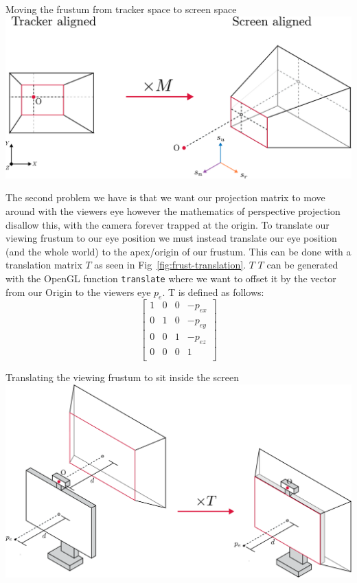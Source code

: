 \begin{figureBox}[label={fig:basis-change}]{Moving the frustum from tracker space to screen space}
    \includegraphics[width = 0.8\linewidth]{./background/figures/projection/realignment.pdf}
\end{figureBox}

The second problem we have is that we want our projection matrix to move around with the viewers eye however the mathematics of perspective projection disallow this, with the camera forever trapped at the origin. To translate our viewing frustum to our eye position we must instead translate our eye position (and the whole world) to the apex/origin of our frustum. This can be done with a translation matrix $T$ as seen in Fig~\ref{fig:frust-translation}. $T$ $T$ can be generated with the OpenGL function \texttt{translate} where we want to offset it by the vector from our Origin to the viewers eye $p_e$. T is defined as follows:
\[
    \begin{bmatrix}
        1 & 0 & 0 & -p_{ex} \\
        0 & 1 & 0 & -p_{ey} \\
        0 & 0 & 1 & -p_{ez} \\
        0 & 0 & 0 & 1       \\
    \end{bmatrix}
\]

\begin{figureBox}[label={fig:frust-translation}]{Translating the viewing frustum to sit inside the screen}
    \includegraphics[width = 0.8\linewidth]{./background/figures/projection/frust-translation.pdf}
\end{figureBox}

